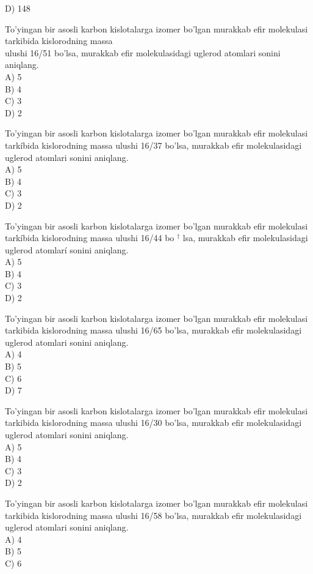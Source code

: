 D) 148
  \item To'yingan bir asosli karbon kislotalarga izomer bo'lgan murakkab efir molekulasi tarkibida kislorodning massa\\
ulushi 16/51 bo'lsa, murakkab efir molekulasidagi uglerod atomlari sonini aniqlang.\\
A) 5\\
B) 4\\
C) 3\\
D) 2
  \item To'yingan bir asosli karbon kislotalarga izomer bo'lgan murakkab efir molekulasi tarkíbida kislorodning massa ulushi 16/37 bo'lsa, murakkab efir molekulasidagi uglerod atomlari sonini aniqlang.\\
A) 5\\
B) 4\\
C) 3\\
D) 2
  \item To'yingan bir asosli karbon kislotalarga izomer bo'lgan murakkab efir molekulasi tarkíbida kislorodning massa ulushi 16/44 bo ${ }^{\dagger}$ lsa, murakkab efir molekulasidagi uglerod atomlarí sonini aniqlang.\\
A) 5\\
B) 4\\
C) 3\\
D) 2
  \item To'yingan bir asosli karbon kislotalarga izomer bo'lgan murakkab efir molekulasi tarkibida kislorodning massa ulushi 16/65 bo'lsa, murakkab efir molekulasidagi uglerod atomlari sonini aniqlang.\\
A) 4\\
B) 5\\
C) 6\\
D) 7
  \item To'yingan bir asosli karbon kislotalarga izomer bo'lgan murakkab efir molekulasi tarkibida kislorodning massa ulushi 16/30 bo'lsa, murakkab efir molekulasidagi uglerod atomlari sonini aniqlang.\\
A) 5\\
B) 4\\
C) 3\\
D) 2
  \item To'yingan bir asosli karbon kislotalarga izomer bo'lgan murakkab efir molekulasi tarkibida kislorodning massa ulushi 16/58 bo'lsa, murakkab efir molekulasidagi uglerod atomlari sonini aniqlang.\\
A) 4\\
B) 5\\
C) 6\\
